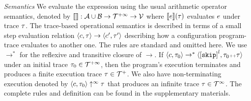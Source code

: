 



\emph{Semantics}
We evaluate the expression using the usual arithmetic operator semantics, denoted by
$\llbracket  \rrbracket : \mathcal{A} \cup \mathcal{B} \to \mathcal{T}^{+\infty} \to \mathcal{V}$ where
$\llbracket e \rrbracket(\mathtt{\tau})$ evaluates $e$ under trace $\mathtt{\tau}$.
The trace-based operational semantics is described in terms of a small step evaluation relation $\langle c, \mathtt{\tau} \rangle \to \langle c', \mathtt{\tau}' \rangle$ describing how a configuration program-trace evaluates to another
one.
The rules are standard and omitted here.
We use $\to^*$ for the reflexive and transitive closure of $\to$. 
If $\config{c, \trace_0} \rightarrow^{*} \config{\clabel{\eskip}^l, \trace_0 \tracecat \trace}$ under an initial trace 
$\mathtt{\tau}_0 \in \mathcal{T}^{+\infty}$,
then the program's execution terminates and produces a finite execution trace $\mathtt{\tau} \in \mathcal{T}^{+}$. We also have non-terminating execution denoted by $\langle c, \mathtt{\tau}_0 \rangle \uparrow^{\infty} \mathtt{\tau}$ that produces an infinite trace $\mathtt{\tau} \in \mathcal{T}^{\infty}$. The complete rules and definition can be found in the supplementary materials.
